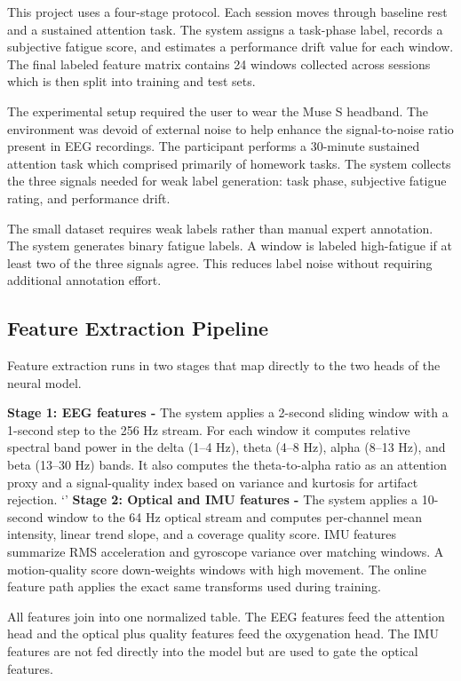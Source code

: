 \documentclass[conference]{IEEEtran}
\begin{document}
This project uses a four-stage protocol. Each session moves through baseline rest and a sustained attention task. The system assigns a task-phase label, records a subjective fatigue score, and estimates a performance drift value for each window. The final labeled feature matrix contains 24 windows collected across sessions which is then split into training and test sets.

The experimental setup required the user to wear the Muse S headband. The environment was devoid of external noise to help enhance the signal-to-noise ratio present in EEG recordings. The participant performs a 30-minute sustained attention task which comprised primarily of homework tasks. The system collects the three signals needed for weak label generation: task phase, subjective fatigue rating, and performance drift.

The small dataset requires weak labels rather than manual expert annotation. The system generates binary fatigue labels. A window is labeled high-fatigue if at least two of the three signals agree. This reduces label noise without requiring additional annotation effort.

\subsection{Feature Extraction Pipeline}

Feature extraction runs in two stages that map directly to the two heads of the neural model.

\textbf{Stage 1: EEG features -} The system applies a 2-second sliding window with a 1-second step to the 256 Hz stream. For each window it computes relative spectral band power in the delta (1--4 Hz), theta (4--8 Hz), alpha (8--13 Hz), and beta (13--30 Hz) bands. It also computes the theta-to-alpha ratio as an attention proxy \cite{b2,b3} and a signal-quality index based on variance and kurtosis for artifact rejection.
`'
\textbf{Stage 2: Optical and IMU features -} The system applies a 10-second window to the 64 Hz optical stream and computes per-channel mean intensity, linear trend slope, and a coverage quality score. IMU features summarize RMS acceleration and gyroscope variance over matching windows. A motion-quality score down-weights windows with high movement. The online feature path applies the exact same transforms used during training.

All features join into one normalized table. The EEG features feed the attention head and the optical plus quality features feed the oxygenation head. The IMU features are not fed directly into the model but are used to gate the optical features. 
\end{document}
